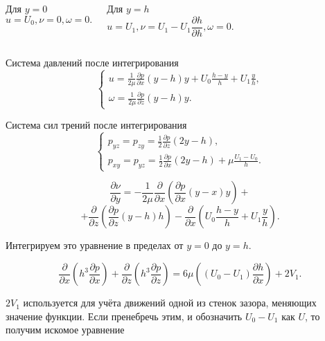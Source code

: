 \documentclass[ignoreonframetext,unicode]{beamer}
\begin{document}
\begin{frame}{}
	
	\begin{columns}
		\begin{block}{Для $y = 0$}
			\[
			u = U_0, \nu = 0, \omega = 0.
			\]
		\end{block}
	
		\begin{block}{Для $y = h$}
		\[
		u = U_1, \nu = U_1 - U_1 \frac{\partial  h}{\partial h}, \omega = 0.
		\]
		\end{block}
	\end{columns}


	\begin{block}{Система давлений после интегрирования}
		\[
		\begin{cases}
			u = \frac{1}{2 \mu} \frac{\partial p}{\partial x} \left( y - h \right) y + U_0 \frac{h - y}{h} + U_1 \frac{y}{h},\\
			\omega = \frac{1}{2 \mu} \frac{\partial p}{\partial z} (y - h) y.
		\end{cases}
		\]
	\end{block}
	

	\begin{block}{Система сил трений после интегрирования}
		\[
		\begin{cases}
			p_{yz} = p_{zy} = \frac{1}{2} \frac{\partial p}{\partial z} \left( 2y - h \right), \\
			p_{xy} = p_{yz} = \frac{1}{2} \frac{\partial p}{\partial x} \left( 2y - h \right) + \mu \frac{U_1 - U_0}{h}.
		\end{cases}
		\]
	\end{block}


\end{frame}	

\begin{frame}{}
	
	\begin{block}{}
		\[
		\frac{\partial \nu}{\partial y} = - \frac{1}{2 \mu} \frac{\partial}{\partial x} \left( \frac{\partial p}{\partial x} (y - x) y \right) +
		\]
		\[
		+ \frac{\partial}{\partial z} \left( \frac{\partial p}{\partial z} (y - h) h \right) - \frac{\partial}{\partial x} \left( U_0 \frac{h - y}{h} + U_1 \frac{y}{h} \right).
		\]
	\end{block}

Интегрируем это уравнение в пределах от $y = 0$ до $y = h$.
\begin{block}{}
	\[
	\frac{\partial}{\partial x} \left( h^3 \frac{\partial p}{\partial x} \right) + \frac{\partial}{\partial z} \left( h^3 \frac{\partial p}{\partial z} \right) = 6 \mu \left( (U_0 - U_1) \frac{\partial h}{\partial x} \right) + 2 V_1.
	\]
\end{block}
$2 V_1$ используется для учёта движений одной из стенок зазора, меняющих значение функции. Если пренебречь этим, и обозначить $U_0 - U_1$ как $U$, то получим искомое уравнение
	
\end{frame}
\end{document}
